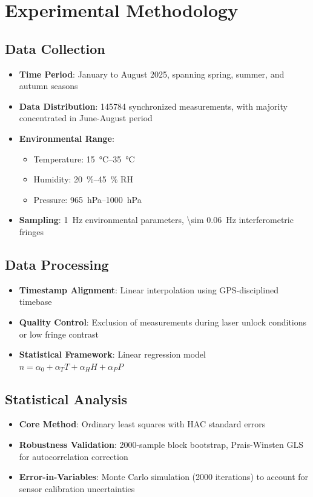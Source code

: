 \documentclass[aip,reprint,groupedaddress,onecolumn,superscriptaddress]{revtex4-2}
\begin{document}
\section{Experimental Methodology}

\subsection{Data Collection}
\begin{itemize}
    \item \textbf{Time Period}: January to August 2025, spanning spring, summer, and autumn seasons
    \item \textbf{Data Distribution}: \num{145784} synchronized measurements, with majority concentrated in June-August period
    \item \textbf{Environmental Range}: 
    \begin{itemize}
        \item Temperature: \SIrange{15}{35}{\degreeCelsius}
        \item Humidity: \SIrange{20}{45}{\percent} RH  
        \item Pressure: \SIrange{965}{1000}{\hecto\pascal}
    \end{itemize}
    \item \textbf{Sampling}: \SI{1}{\hertz} environmental parameters, \SI{\sim 0.06}{\hertz} interferometric fringes
\end{itemize}

\subsection{Data Processing}
\begin{itemize}
    \item \textbf{Timestamp Alignment}: Linear interpolation using GPS-disciplined timebase
    \item \textbf{Quality Control}: Exclusion of measurements during laser unlock conditions or low fringe contrast
    \item \textbf{Statistical Framework}: Linear regression model $n = \alpha_0 + \alpha_T T + \alpha_H H + \alpha_P P$
\end{itemize}

\subsection{Statistical Analysis}
\begin{itemize}
    \item \textbf{Core Method}: Ordinary least squares with HAC standard errors
    \item \textbf{Robustness Validation}: \num{2000}-sample block bootstrap, Prais-Winsten GLS for autocorrelation correction
    \item \textbf{Error-in-Variables}: Monte Carlo simulation (\num{2000} iterations) to account for sensor calibration uncertainties
\end{itemize}
\end{document}
